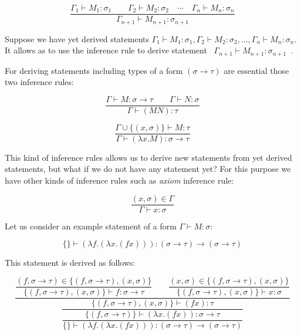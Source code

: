 \documentclass[12pt,a4paper]{report}
\newcommand{\Lets}{Let us\xspace}
\newcommand{\turst}[3]{$#1 \vdash #2 : #3$\xspace}
\newcommand{\GMS}{\turst{\Gamma}{M}{\sigma}}
\begin{document}
	\begin{equation*}
		\frac{\Gamma_1 \vdash M_1 : \sigma_1 \qquad
			  \Gamma_2 \vdash M_2 : \sigma_2 \quad
			  \dotsm \quad
		      \Gamma_n \vdash M_n : \sigma_n}
		     {\Gamma_{n+1} \vdash M_{n+1} : \sigma_{n+1}}
	\end{equation*}	
	
	Suppose we have yet derived statements 
	$\Gamma_1 \vdash M_1 : \sigma_1 ,
	 \Gamma_2 \vdash M_2 : \sigma_2 ,
	 \dots ,
	 \Gamma_n \vdash M_n : \sigma_n$. 
	It allows as to use the inference rule to derive statement
	\mbox{ $\Gamma_{n+1} \vdash M_{n+1} : \sigma_{n+1}$ }.
	 
	For deriving statements including types of a form 
	$(\sigma \rightarrow \tau)$ are essential those two 
	inference rules:
	
	\begin{equation*}
		\frac{\Gamma \vdash M : \sigma \rightarrow \tau \qquad
			  \Gamma \vdash N : \sigma }
		     {\Gamma \vdash (M N) : \tau }
	\end{equation*}	
	
	\begin{equation*}
		\frac{\Gamma \cup \{ ( x,\sigma ) \} \vdash M : \tau }
		     {\Gamma \vdash (\lambda x . M) : \sigma \rightarrow \tau }
	\end{equation*}		 
	 
	This kind of inference rules allows us to derive new statements from yet derived statements, but 
	what if we do not have any statement yet? 
	For this purpose we have other kinds of inference rules such as {\it axiom} inference rule:   
	
	\begin{equation*}
		\frac{( x , \sigma )  \in \Gamma}
		     {\Gamma \vdash x : \sigma}
	\end{equation*}	
	
	\Lets consider an example statement of a form \GMS :
	
	\[
		\{\} \vdash (\lambda f . (\lambda x . (f x) )) : 
		(\sigma \rightarrow \tau) \rightarrow ( \sigma \rightarrow \tau ) 
	\]
		
	This statement is derived as follows: 
	
	\begin{equation*}
	\dfrac{
		\dfrac{ (f,\sigma \rightarrow \tau) \in \{ (f,\sigma \rightarrow \tau) , (x,\sigma)  \}  }
		     { \{ (f,\sigma \rightarrow \tau) , (x,\sigma)  \} \vdash f : \sigma \rightarrow \tau }
		\qquad
		\dfrac{ (x,\sigma) \in \{ (f,\sigma \rightarrow \tau) , (x,\sigma)  \}  }
		     { \{ (f,\sigma \rightarrow \tau) , (x,\sigma)  \} \vdash x : \sigma }
		 }
		 {
			\dfrac{		 	
		 		\{ (f,\sigma \rightarrow \tau) , (x,\sigma)  \} \vdash (f x) : \tau
		 	}{
				\dfrac{\{ (f,\sigma \rightarrow \tau) \} \vdash (\lambda x . (f x) ) : 
				\sigma \rightarrow \tau}
				{ \{ \} \vdash (\lambda f . (\lambda x . (f x) ) ) 
				  : (\sigma \rightarrow \tau) \rightarrow (\sigma \rightarrow \tau) }
		 	}
		 }
	\end{equation*}		
	
\end{document}
